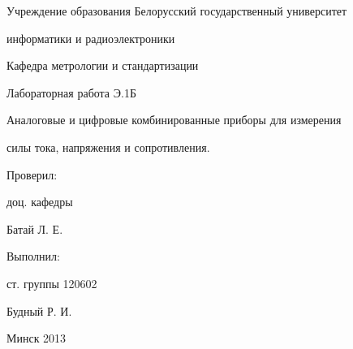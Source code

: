 \thispagestyle{empty}

\begin{center}
Учреждение образования
Белорусский государственный университет\par
информатики и радиоэлектроники\par 
\vspace{5mm}
Кафедра метрологии и стандартизации\par
\par

\end{center}

\vspace{70mm}

\begin{center}
Лабораторная работа Э.1Б\par
Аналоговые и цифровые комбинированные приборы для измерения\par
 силы тока, напряжения и сопротивления.\par
\par
\end{center}

\vspace{50mm}

\begin{multicols}{2}
Проверил:

доц. кафедры

Батай Л. Е.
\begin{flushright}

Выполнил:

ст. группы 120602

Будный Р. И.

\end{flushright}
\end{multicols}

\vspace{50mm}
\begin{center}
{Минск 2013}
\end{center}

\newpage
